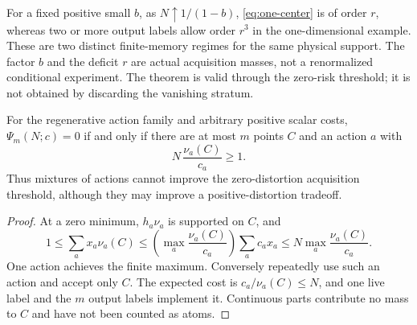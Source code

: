 For a fixed positive small $b$, as $N\uparrow1/(1-b)$, \eqref{eq:one-center} is of order $r$, whereas two or more output labels allow order $r^3$ in the one-dimensional example. These are two distinct finite-memory regimes for the same physical support. The factor $b$ and the deficit $r$ are actual acquisition masses, not a renormalized conditional experiment. The theorem is valid through the zero-risk threshold; it is not obtained by discarding the vanishing stratum.

\begin{proposition}\label{prop:zero}
For the regenerative action family and arbitrary positive scalar costs, $\Psi_m(N;c)=0$ if and only if there are at most $m$ points $C$ and an action $a$ with
\begin{equation}\label{eq:zero-action}
 N\,\frac{\nu_a(C)}{c_a}\ge1.
\end{equation}
Thus mixtures of actions cannot improve the zero-distortion acquisition threshold, although they may improve a positive-distortion tradeoff.
\end{proposition}
\begin{proof}
At a zero minimum, $h_a\nu_a$ is supported on $C$, and
\[
 1\le\sum_a x_a\nu_a(C)
 \le\left(\max_a\frac{\nu_a(C)}{c_a}\right)\sum_a c_ax_a
 \le N\max_a\frac{\nu_a(C)}{c_a}.
\]
One action achieves the finite maximum. Conversely repeatedly use such an action and accept only $C$. The expected cost is $c_a/\nu_a(C)\le N$, and one live label and the $m$ output labels implement it. Continuous parts contribute no mass to $C$ and have not been counted as atoms.
\end{proof}
